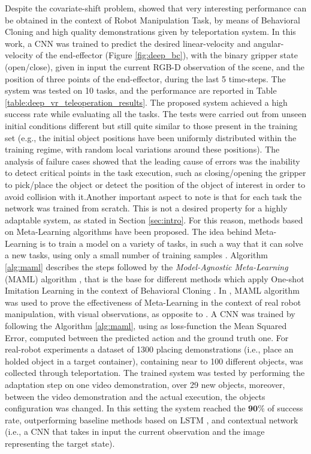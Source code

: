 Despite the covariate-shift problem, \cite{zhang2018deep_vr_teleoperation} showed that very interesting performance can be obtained in the context of Robot Manipulation Task, by means of Behavioral Cloning and high quality demonstrations given by teleportation system. In this work, a CNN was trained to predict the desired linear-velocity and angular-velocity of the end-effector (Figure \ref{fig:deep_bc}), with the binary gripper state (open/close), given in input the current RGB-D observation of the scene, and the position of three points of the end-effector, during the last 5 time-steps. The system was tested on 10 tasks, and the performance are reported in Table \ref{table:deep_vr_teleoperation_results}. The proposed system achieved a high success rate while evaluating all the tasks. The tests were carried out from unseen initial conditions different but still quite similar to those present in the training set (e.g., the initial object positions have been uniformly distributed within the training regime, with random local variations around these positions). The analysis of failure cases showed that the leading cause of errors was the inability to detect critical points in the task execution, such as closing/opening the gripper to pick/place the object or detect the position of the object of interest in order to avoid collision with it.\unskip Another important aspect to note is that for each task the network was trained from scratch. This is not a desired property for a highly adaptable system, as stated in Section \ref{sec:intro}. For this reason, methods based on Meta-Learning algorithms have been proposed. The idea behind Meta-Learning is to train a model on a variety of tasks, in such a way that it can solve a new tasks, using only a small number of training samples \cite{finn2017maml}. Algorithm \ref{alg:maml} describes the steps followed by the \textit{Model-Agnostic Meta-Learning} (MAML) algorithm \cite{finn2017maml}, that is the base for different methods which apply One-shot Imitation Learning in the context of Behavioral Cloning \cite{finn2017one_shot_visual_il,yu2018daml,yu2018one_shot_hil}.
\newline In \cite{finn2017one_shot_visual_il}, MAML algorithm was used to prove the effectiveness of Meta-Learning in the context of real robot manipulation, with visual observations, as opposite to \cite{duan2017one_shot_il}. A CNN was trained by following the Algorithm \ref{alg:maml}, using as loss-function the Mean Squared Error, computed between the predicted action and the ground truth one. For real-robot experiments a dataset of 1300 placing demonstrations (i.e., place an holded object in a target container), containing near to 100 different objects, was collected through teleportation. The trained system was tested by performing the adaptation step on one video demonstration, over 29 new objects, moreover, between the video demonstration and the actual execution, the objects configuration was changed. In this setting the system reached the $\mathbf{90\%}$ of success rate, outperforming baseline methods based on LSTM \cite{duan2017one_shot_il}, and contextual network (i.e., a CNN that takes in input the current observation and the image representing the target state). 
